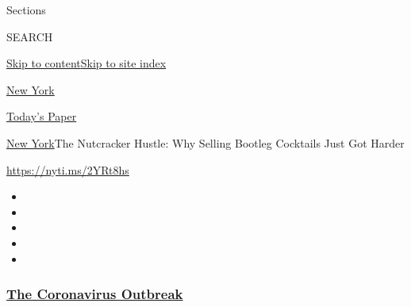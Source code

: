 Sections

SEARCH

\protect\hyperlink{site-content}{Skip to
content}\protect\hyperlink{site-index}{Skip to site index}

\href{https://www.nytimes3xbfgragh.onion/section/nyregion}{New York}

\href{https://myaccount.nytimes3xbfgragh.onion/auth/login?response_type=cookie\&client_id=vi}{}

\href{https://www.nytimes3xbfgragh.onion/section/todayspaper}{Today's
Paper}

\href{/section/nyregion}{New York}\textbar{}The Nutcracker Hustle: Why
Selling Bootleg Cocktails Just Got Harder

\url{https://nyti.ms/2YRt8hs}

\begin{itemize}
\item
\item
\item
\item
\item
\end{itemize}

\hypertarget{the-coronavirus-outbreak}{%
\subsubsection{\texorpdfstring{\href{https://www.nytimes3xbfgragh.onion/news-event/coronavirus?name=styln-coronavirus-national\&region=TOP_BANNER\&block=storyline_menu_recirc\&action=click\&pgtype=Article\&impression_id=ab0b9240-f4bd-11ea-850c-d13f9cab80f0\&variant=undefined}{The
Coronavirus
Outbreak}}{The Coronavirus Outbreak}}\label{the-coronavirus-outbreak}}

